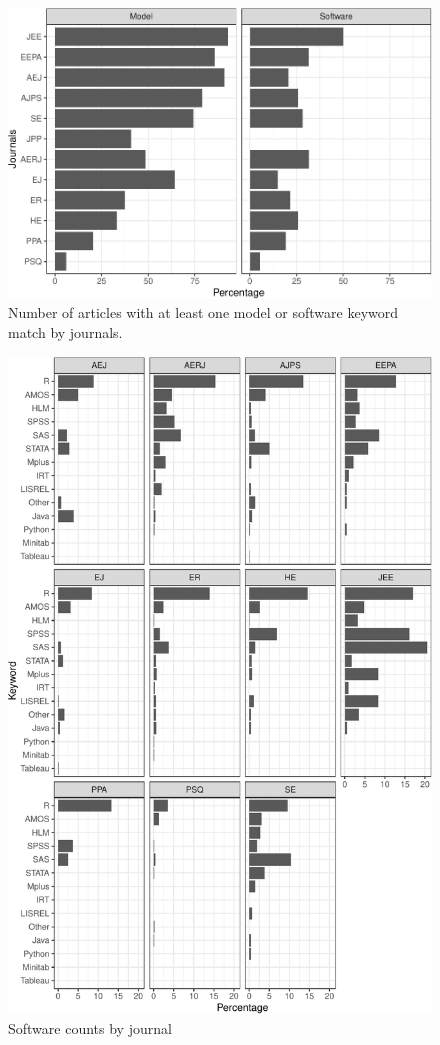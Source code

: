 \documentclass[english,,man]{apa6}
\theoremstyle{definition}
\theoremstyle{definition}
\theoremstyle{definition}
\theoremstyle{remark}
\begin{document}
\begin{figure}
\centering
\includegraphics{software_files/figure-latex/count-software-1.pdf}
\caption{\label{fig:count-software}Number of articles with at least one
model or software keyword match by journals.}
\end{figure}

\begin{figure}
\centering
\includegraphics{software_files/figure-latex/software-journal-1.pdf}
\caption{\label{fig:software-journal}Software counts by journal}
\end{figure}
\end{document}

